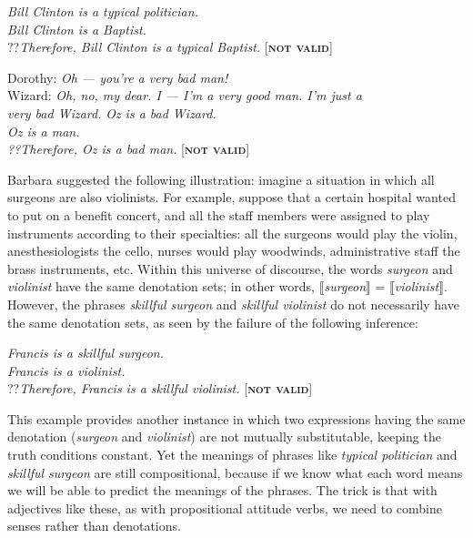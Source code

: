 \ea \label{ex:15.6}
\textit{Bill Clinton is a typical politician.}\\
\textit{Bill Clinton is a Baptist.}\\\FelixHRule
??\textit{Therefore, Bill Clinton is a typical Baptist.} \hfill  [\textbf{\textsc{not valid}}]
\z

\ea \label{ex:15.7}
\ea  Dorothy: \textit{Oh — you’re a very bad man!}\\
Wizard: \textit{Oh, no, my dear. I — I’m a very good man. I’m just a \\
\hspace{1.2cm} very bad Wizard.} 
\ex  
  \textit{Oz is a bad Wizard.}\\
\textit{Oz is a man.\\
\FelixHRule
??Therefore, Oz is a bad man.}  \hfill [\textbf{\textsc{not valid}}]
\z \z


Barbara \citet{Partee1995} suggested the following illustration: imagine a situation in which all surgeons are also violinists. For example, suppose that a certain hospital wanted to put on a benefit concert, and all the staff members were assigned to play instruments according to their specialties: all the surgeons would play the violin, anesthesiologists the cello, nurses would play woodwinds, administrative staff the brass instruments, etc. Within this universe of discourse, the words \textit{surgeon} and \textit{violinist} have the same denotation sets; in other words, $\llbracket$\textit{surgeon}$\rrbracket$  = $\llbracket$\textit{violinist}$\rrbracket$. However, the phrases \textit{skillful surgeon} and \textit{skillful violinist} do not necessarily have the same denotation sets, as seen by the failure of the following inference:


\ea \label{ex:15.8}
\textit{Francis is a skillful surgeon.}\\
\textit{Francis is a violinist.}\\
\FelixHRule
??\textit{Therefore, Francis is a skillful violinist.}  \hfill [\textbf{\textsc{not valid}}]
\z


This example provides another instance in which two expressions having the same denotation (\textit{surgeon} and \textit{violinist}) are not mutually substitutable, keeping the truth conditions constant. Yet the meanings of phrases like \textit{typical politician} and \textit{skillful surgeon} are still compositional, because if we know what each word means we will be able to predict the meanings of the phrases. The trick is that with adjectives like these, as with propositional attitude verbs, we need to combine senses rather than denotations.



